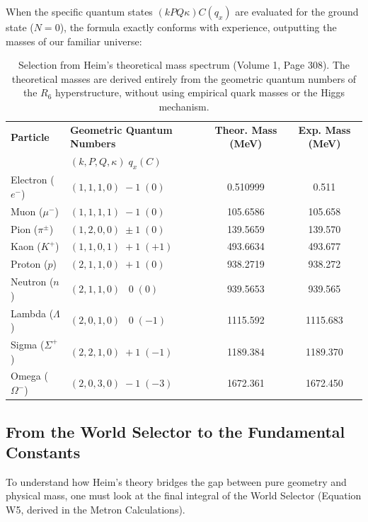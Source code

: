 \documentclass[11pt,a4paper,oneside]{article}
\begin{document}
When the specific quantum states $(kPQ\kappa)C(q_x)$ are evaluated for the ground state ($N=0$), the formula exactly conforms with experience, outputting the masses of our familiar universe:

\begin{table}[htbp]
\centering
\renewcommand{\arraystretch}{1.3}
\begin{tabular}{@{}llcc@{}}
\toprule
\textbf{Particle} & \textbf{Geometric Quantum Numbers} & \textbf{Theor. Mass (MeV)} & \textbf{Exp. Mass (MeV)} \\
& $(k, P, Q, \kappa)\; q_x (C)$ & & \\
\midrule
\rowcolor{theoryblue!5}
Electron ($e^-$) & $(1, 1, 1, 0)\; -1\; (0)$ & 0.510999 & 0.511 \\
Muon ($\mu^-$) & $(1, 1, 1, 1)\; -1\; (0)$ & 105.6586 & 105.658 \\
\rowcolor{theoryblue!5}
Pion ($\pi^\pm$) & $(1, 2, 0, 0)\; \pm 1\; (0)$ & 139.5659 & 139.570 \\
Kaon ($K^+$) & $(1, 1, 0, 1)\; +1\; (+1)$ & 493.6634 & 493.677 \\
\rowcolor{theorygray!20}
Proton ($p$) & $(2, 1, 1, 0)\; +1\; (0)$ & 938.2719 & 938.272 \\
\rowcolor{theorygray!20}
Neutron ($n$) & $(2, 1, 1, 0)\; \;\;0\; (0)$ & 939.5653 & 939.565 \\
Lambda ($\Lambda$) & $(2, 0, 1, 0)\; \;\;0\; (-1)$ & 1115.592 & 1115.683 \\
Sigma ($\Sigma^+$) & $(2, 2, 1, 0)\; +1\; (-1)$ & 1189.384 & 1189.370 \\
Omega ($\Omega^-$) & $(2, 0, 3, 0)\; -1\; (-3)$ & 1672.361 & 1672.450 \\
\bottomrule
\end{tabular}
\caption{Selection from Heim's theoretical mass spectrum (Volume 1, Page 308). The theoretical masses are derived entirely from the geometric quantum numbers of the $R_6$ hyperstructure, without using empirical quark masses or the Higgs mechanism.}
\end{table}

\subsection{From the World Selector to the Fundamental Constants}

To understand how Heim’s theory bridges the gap between pure geometry and physical mass, one must look at the final integral of the World Selector (Equation W5, derived in the Metron Calculations). 
\end{document}
